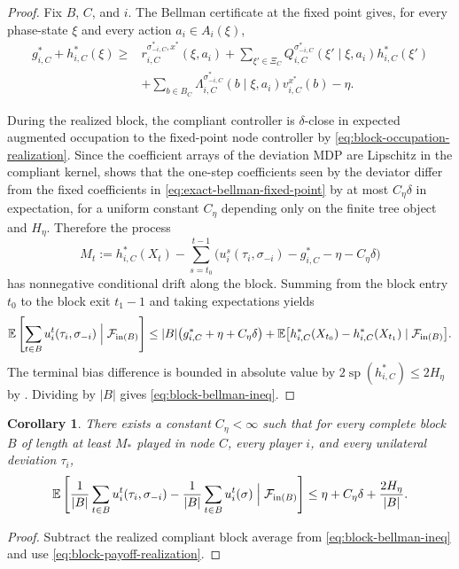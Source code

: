 \documentclass[12pt]{article}
\newtheorem{corollary}[theorem]{Corollary}
\theoremstyle{definition}
\newcommand{\E}{\mathbb{E}}
\newcommand{\1}{\mathbf{1}}
\newcommand{\cF}{\mathcal{F}}
\DeclareMathOperator{\spn}{sp}
\begin{document}
\begin{proof}
Fix $B$, $C$, and $i$.  The Bellman certificate at the fixed point gives, for every
phase-state $\xi$ and every action $a_i\in A_i(\xi)$,
\begin{align}
\label{eq:exact-bellman-fixed-point}
g_{i,C}^* + h_{i,C}^*(\xi)
\ge {}
&r_{i,C}^{\sigma_{-i,C}^*,x^*}(\xi,a_i)
+
\sum_{\xi'\in\Xi_C}Q_{i,C}^{\sigma_{-i,C}^*}(\xi'\mid\xi,a_i)h_{i,C}^*(\xi')
\\
&+
\sum_{b\in B_C}\Lambda_{i,C}^{\sigma_{-i,C}^*}(b\mid\xi,a_i)v_{i,C}^{x^*}(b)
-\eta.
\nonumber
\end{align}

During the realized block, the compliant controller is $\delta$-close in expected
augmented occupation to the fixed-point node controller by
\eqref{eq:block-occupation-realization}.  Since the coefficient arrays of the
deviation MDP are Lipschitz in the compliant kernel, 
shows that the one-step coefficients seen by the deviator differ from the fixed
coefficients in \eqref{eq:exact-bellman-fixed-point} by at most $C_\eta\delta$ in
expectation, for a uniform constant $C_\eta$ depending only on the finite tree
object and $H_\eta$.  Therefore the process
\[
M_t:=h_{i,C}^*(X_t)-\sum_{s=t_0}^{t-1}
\bigl(u_i^s(\tau_i,\sigma_{-i})-g_{i,C}^* -\eta - C_\eta\delta\bigr)
\]
has nonnegative conditional drift along the block.  Summing from the block entry
$t_0$ to the block exit $t_1-1$ and taking expectations yields
\[
\E\left[\sum_{t\in B}u_i^t(\tau_i,\sigma_{-i})\Bigm|\cF_{\mathrm{in}(B)}\right]
\le
|B|\bigl(g_{i,C}^*+\eta+C_\eta\delta\bigr)
+
\E\bigl[h_{i,C}^*(X_{t_0})-h_{i,C}^*(X_{t_1})\mid\cF_{\mathrm{in}(B)}\bigr].
\]
The terminal bias difference is bounded in absolute value by
$2\spn(h_{i,C}^*)\le 2H_\eta$ by .  Dividing by $|B|$ gives
\eqref{eq:block-bellman-ineq}.
\end{proof}

\begin{corollary}
\label{cor:block-regret}
There exists a constant $C_\eta<\infty$ such that for every complete block $B$ of
length at least $M_*$ played in node $C$, every player $i$, and every unilateral
deviation $\tau_i$,
\[
\E\left[
\frac1{|B|}\sum_{t\in B}u_i^t(\tau_i,\sigma_{-i})
-
\frac1{|B|}\sum_{t\in B}u_i^t(\sigma)
\Bigm|\cF_{\mathrm{in}(B)}
\right]
\le
\eta + C_\eta\delta + \frac{2H_\eta}{|B|}.
\]
\end{corollary}

\begin{proof}
Subtract the realized compliant block average from
\eqref{eq:block-bellman-ineq} and use
\eqref{eq:block-payoff-realization}.
\end{proof}
\end{document}
